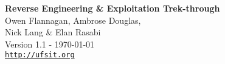 \pagecolor{black}
\begin{center}
  \Huge
\color{white}
\textbf{Reverse Engineering \& Exploitation Trek-through} \\[1cm]

\huge
Owen Flannagan, Ambrose Douglas, \\ Nick Lang \& Elan Rasabi \\[5.7in]

\normalsize
Version 1.1 - \today \\
\href{http://ufsit.org}{\tt \color{white}http://ufsit.org}
\end{center}
